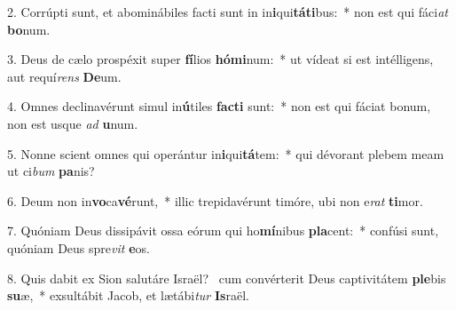 2. Corrúpti sunt, et abominábiles facti sunt in in\textbf{i}qui\textbf{tá}\textbf{ti}bus:~*  non est qui fáci\textit{at} \textbf{bo}num.\

3. Deus de cælo prospéxit super \textbf{fí}lios \textbf{hó}\textbf{mi}num:~*  ut vídeat si est intélligens, aut requí\textit{rens} \textbf{De}um.\

4. Omnes declinavérunt simul in\textbf{ú}tiles \textbf{fac}\textbf{ti} sunt:~*  non est qui fáciat bonum, non est usque \textit{ad} \textbf{u}num.\

5. Nonne scient omnes qui operántur in\textbf{i}qui\textbf{tá}tem:~*  qui dévorant plebem meam ut ci\textit{bum} \textbf{pa}nis?\

6. Deum non in\textbf{vo}ca\textbf{vé}runt,~*  illic trepidavérunt timóre, ubi non e\textit{rat} \textbf{ti}mor.\

7. Quóniam Deus dissipávit ossa eórum qui ho\textbf{mí}nibus \textbf{pla}cent:~*  confúsi sunt, quóniam Deus spre\textit{vit} \textbf{e}os.\

8. Quis dabit ex Sion salutáre Israël? \dag\  cum convérterit Deus captivitátem \textbf{ple}bis \textbf{su}æ,~*  exsultábit Jacob, et lætábi\textit{tur} \textbf{Is}raël.\

